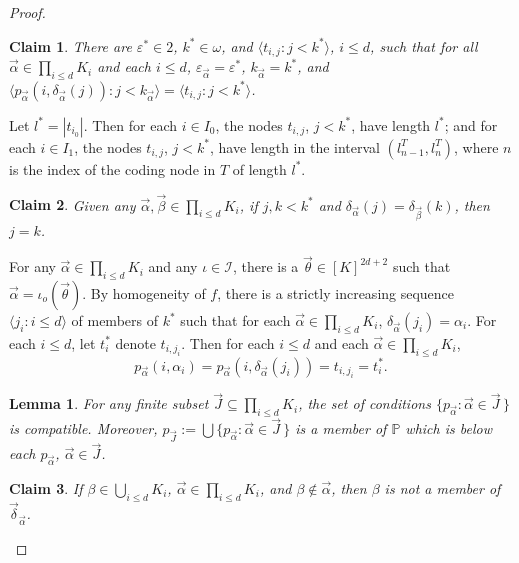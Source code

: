 \documentclass{amsart}
\newtheorem{lem}[thm]{Lemma}
\newtheorem{claim}{Claim}
\theoremstyle{remark}
\theoremstyle{definition}
\theoremstyle{remark}
\newcommand{\al}{\alpha}
\newcommand{\om}{\omega}
\newcommand{\sse}{\subseteq}
\newcommand{\bP}{\mathbb{P}}
\newcommand{\lgl}{\langle}
\newcommand{\rgl}{\rangle}
\begin{document}
\begin{proof}
\begin{claim}\label{claim.onetypes(c)}
There are $\varepsilon^*\in 2$, $k^*\in\om$,
and $ \lgl t_{i,j}: j<k^*\rgl$, $i\le d$,
 such that
for all $\vec{\al}\in \prod_{i\le d}K_i$ and  each $i\le d$,
 $\varepsilon_{\vec{\al}}=\varepsilon^*$,
$k_{\vec\al}=k^*$,  and
$\lgl p_{\vec\al}(i,\delta_{\vec\al}(j)):j<k_{\vec\al}\rgl
=
 \lgl t_{i,j}: j<k^*\rgl$.
\end{claim}



Let $l^*=|t_{i_0}|$.
Then for each $i\in I_0$,
 the nodes  $t_{i,j}$,  $j<k^*$,    have  length $l^*$;
and for each $i\in I_1$,
the nodes $t_{i,j}$,  $j<k^*$,  have length in the interval $(l^T_{n-1},l^T_n)$,
where $n$ is the index of the coding node in $T$ of length $l^*$.




\begin{claim}\label{claim.j=j'(c)}
Given any $\vec\al,\vec\beta\in \prod_{i\le d}K_i$,
if $j,k<k^*$ and $\delta_{\vec\al}(j)=\delta_{\vec\beta}(k)$,
 then $j=k$.
\end{claim}



For any $\vec\al\in \prod_{i\le d}K_i$ and any $\iota\in\mathcal{I}$, there is a $\vec\theta\in[K]^{2d+2}$ such that $\vec\al=\iota_o(\vec\theta)$.
By homogeneity of $f$, there is a strictly increasing sequence
$\lgl j_i:i\le d\rgl$  of members of $k^*$ such that for each $\vec\al\in \prod_{i\le d}K_i$,
$\delta_{\vec\al}(j_i)=\al_i$.
For each $i\le d$, let $t^*_i$ denote $t_{i,j_i}$.
Then  for each $i\le d$ and each $\vec\al\in \prod_{i\le d}K_i$,
\begin{equation}
p_{\vec\al}(i,\al_i)=p_{\vec{\al}}(i, \delta_{\vec\al}(j_i))=t_{i,j_i}=t^*_i.
\end{equation}





\begin{lem}\label{lem.compat(c)}
For any finite subset $\vec{J}\sse \prod_{i\le d}K_i$,
the set of conditions $\{p_{\vec{\al}}:\vec{\al}\in \vec{J}\,\}$ is  compatible.
Moreover,
$p_{\vec{J}}:=\bigcup\{p_{\vec{\al}}:\vec{\al}\in \vec{J}\,\}$
is a member of $\bP$ which is below each
$p_{\vec{\al}}$, $\vec\al\in\vec{J}$.
\end{lem}



\begin{claim}\label{subclaimA(c)}
If $\beta\in \bigcup_{i\le d}K_i$,
$\vec{\al}\in\prod_{i\le d}K_i$,
and $\beta\not\in\vec\al$,
 then
$\beta$ is not  a member of   $\vec{\delta}_{\vec{\al}}$.
\end{claim}




\end{proof}
\end{document}
